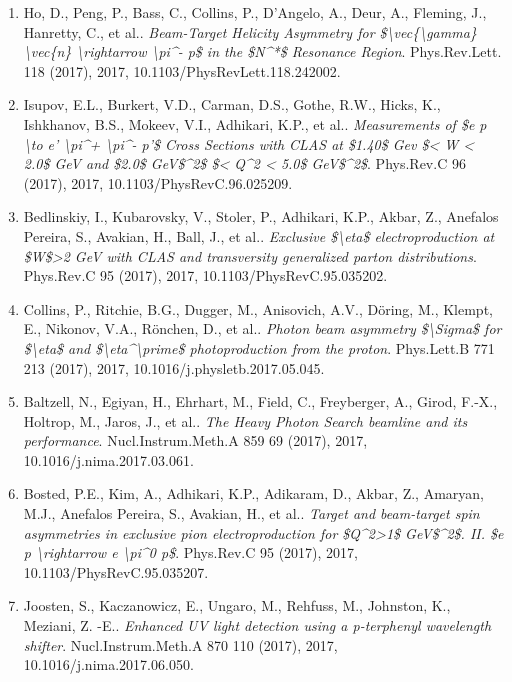 \begin{enumerate}
\item Ho, D., Peng, P., Bass, C., Collins, P., D'Angelo, A., Deur, A., Fleming, J., Hanretty, C., et al.. \textit{Beam-Target Helicity Asymmetry for \$\textbackslash{}vec\{\textbackslash{}gamma\} \textbackslash{}vec\{n\} \textbackslash{}rightarrow \textbackslash{}pi\textasciicircum{}- p\$ in the \$N\textasciicircum{}*\$ Resonance Region}. Phys.Rev.Lett. 118 (2017), 2017, 10.1103/PhysRevLett.118.242002.
\item Isupov, E.L., Burkert, V.D., Carman, D.S., Gothe, R.W., Hicks, K., Ishkhanov, B.S., Mokeev, V.I., Adhikari, K.P., et al.. \textit{Measurements of \$e p \textbackslash{}to e' \textbackslash{}pi\textasciicircum{}+ \textbackslash{}pi\textasciicircum{}- p'\$ Cross Sections with CLAS at \$1.40\$ Gev \$< W < 2.0\$ GeV and \$2.0\$ GeV\$\textasciicircum{}2\$ \$< Q\textasciicircum{}2 < 5.0\$ GeV\$\textasciicircum{}2\$}. Phys.Rev.C 96 (2017), 2017, 10.1103/PhysRevC.96.025209.
\item Bedlinskiy, I., Kubarovsky, V., Stoler, P., Adhikari, K.P., Akbar, Z., Anefalos Pereira, S., Avakian, H., Ball, J., et al.. \textit{Exclusive \$\textbackslash{}eta\$ electroproduction at \$W\$>2 GeV with CLAS and transversity generalized parton distributions}. Phys.Rev.C 95 (2017), 2017, 10.1103/PhysRevC.95.035202.
\item Collins, P., Ritchie, B.G., Dugger, M., Anisovich, A.V., Döring, M., Klempt, E., Nikonov, V.A., Rönchen, D., et al.. \textit{Photon beam asymmetry \$\textbackslash{}Sigma\$ for \$\textbackslash{}eta\$ and \$\textbackslash{}eta\textasciicircum{}\textbackslash{}prime\$ photoproduction from the proton}. Phys.Lett.B 771 213 (2017), 2017, 10.1016/j.physletb.2017.05.045.
\item Baltzell, N., Egiyan, H., Ehrhart, M., Field, C., Freyberger, A., Girod, F.-X., Holtrop, M., Jaros, J., et al.. \textit{The Heavy Photon Search beamline and its performance}. Nucl.Instrum.Meth.A 859 69 (2017), 2017, 10.1016/j.nima.2017.03.061.
\item Bosted, P.E., Kim, A., Adhikari, K.P., Adikaram, D., Akbar, Z., Amaryan, M.J., Anefalos Pereira, S., Avakian, H., et al.. \textit{Target and beam-target spin asymmetries in exclusive pion electroproduction for \$Q\textasciicircum{}2>1\$ GeV\$\textasciicircum{}2\$. II. \$e p \textbackslash{}rightarrow e \textbackslash{}pi\textasciicircum{}0 p\$}. Phys.Rev.C 95 (2017), 2017, 10.1103/PhysRevC.95.035207.
\item Joosten, S., Kaczanowicz, E., Ungaro, M., Rehfuss, M., Johnston, K., Meziani, Z. -E.. \textit{Enhanced UV light detection using a p-terphenyl wavelength shifter}. Nucl.Instrum.Meth.A 870 110 (2017), 2017, 10.1016/j.nima.2017.06.050.

\end{enumerate}
